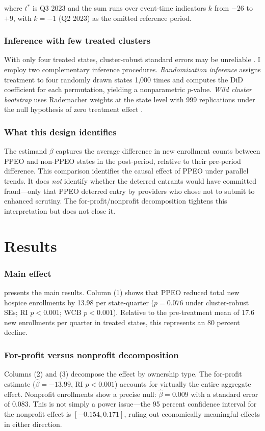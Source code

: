 \documentclass[12pt]{article}
\begin{document}
\noindent where $t^*$ is Q3 2023 and the sum runs over event-time indicators $k$ from $-26$ to $+9$, with $k = -1$ (Q2 2023) as the omitted reference period.

\subsubsection*{Inference with few treated clusters} With only four treated states, cluster-robust standard errors may be unreliable \citep{cameron2008bootstrap}. I employ two complementary inference procedures. \textit{Randomization inference} assigns treatment to four randomly drawn states 1,000 times and computes the DiD coefficient for each permutation, yielding a nonparametric $p$-value. \textit{Wild cluster bootstrap} uses Rademacher weights at the state level with 999 replications under the null hypothesis of zero treatment effect \citep{mackinnon2015wild}.

\subsubsection*{What this design identifies} The estimand $\beta$ captures the average difference in new enrollment counts between PPEO and non-PPEO states in the post-period, relative to their pre-period difference. This comparison identifies the causal effect of PPEO under parallel trends. It does \textit{not} identify whether the deterred entrants would have committed fraud---only that PPEO deterred entry by providers who chose not to submit to enhanced scrutiny. The for-profit/nonprofit decomposition tightens this interpretation but does not close it.

\section{Results}
\label{sec:results}

\subsubsection*{Main effect}  presents the main results. Column (1) shows that PPEO reduced total new hospice enrollments by 13.98 per state-quarter ($p = 0.076$ under cluster-robust SEs; RI $p < 0.001$; WCB $p < 0.001$). Relative to the pre-treatment mean of 17.6 new enrollments per quarter in treated states, this represents an 80 percent decline.

\subsubsection*{For-profit versus nonprofit decomposition} Columns (2) and (3) decompose the effect by ownership type. The for-profit estimate ($\hat{\beta} = -13.99$, RI $p < 0.001$) accounts for virtually the entire aggregate effect. Nonprofit enrollments show a precise null: $\hat{\beta} = 0.009$ with a standard error of 0.083. This is not simply a power issue---the 95 percent confidence interval for the nonprofit effect is $[-0.154, 0.171]$, ruling out economically meaningful effects in either direction.
\end{document}
